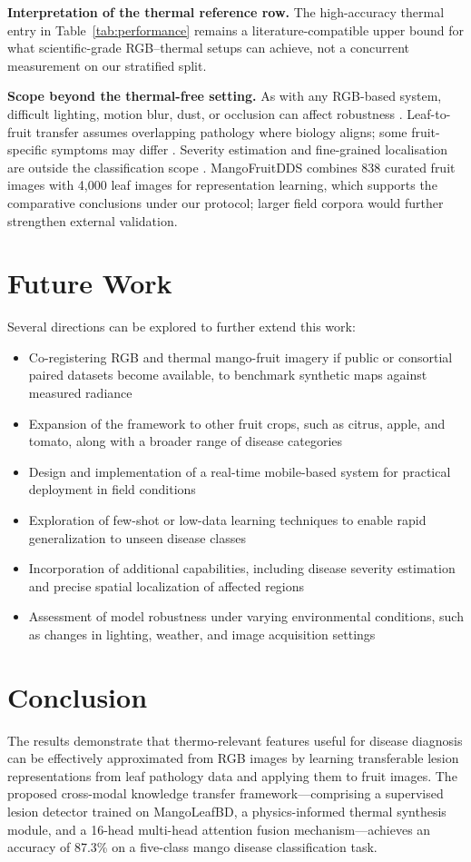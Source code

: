 \documentclass[utf8]{FrontiersinHarvard} %
\begin{document}
\textbf{Interpretation of the thermal reference row.} The high-accuracy thermal entry in Table~\ref{tab:performance} remains a literature-compatible upper bound for what scientific-grade RGB--thermal setups can achieve, not a concurrent measurement on our stratified split.

\textbf{Scope beyond the thermal-free setting.} As with any RGB-based system, difficult lighting, motion blur, dust, or occlusion can affect robustness \cite{kouidri2021}. Leaf-to-fruit transfer assumes overlapping pathology where biology aligns; some fruit-specific symptoms may differ \cite{weiss2016}. Severity estimation and fine-grained localisation are outside the classification scope \cite{wang2022_synthetic}. MangoFruitDDS combines 838 curated fruit images with 4{,}000 leaf images for representation learning, which supports the comparative conclusions under our protocol; larger field corpora would further strengthen external validation.

\section{Future Work}
Several directions can be explored to further extend this work:
\begin{itemize}
    \item Co-registering RGB and thermal mango-fruit imagery if public or consortial paired datasets become available, to benchmark synthetic maps against measured radiance
    \item Expansion of the framework to other fruit crops, such as citrus, apple, and tomato, along with a broader range of disease categories
    \item Design and implementation of a real-time mobile-based system for practical deployment in field conditions
    \item Exploration of few-shot or low-data learning techniques to enable rapid generalization to unseen disease classes
    \item Incorporation of additional capabilities, including disease severity estimation and precise spatial localization of affected regions
    \item Assessment of model robustness under varying environmental conditions, such as changes in lighting, weather, and image acquisition settings
\end{itemize}

\FloatBarrier
\section{Conclusion}
The results demonstrate that thermo-relevant features useful for disease diagnosis can be effectively approximated from RGB images by learning transferable lesion representations from leaf pathology data and applying them to fruit images. The proposed cross-modal knowledge transfer framework—comprising a supervised lesion detector trained on MangoLeafBD, a physics-informed thermal synthesis module, and a 16-head multi-head attention fusion mechanism—achieves an accuracy of 87.3\% on a five-class mango disease classification task.
\end{document}
